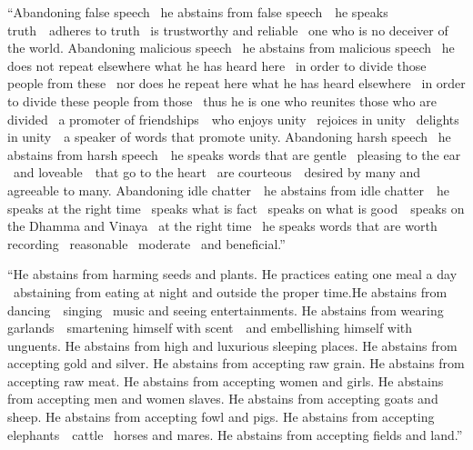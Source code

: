 \begin{english-only-justify}
  ``Abandoning false speech \breathmark\ he abstains from false \mbox{speech}~\breathmark\ he speaks \mbox{truth}~\breathmark\ adheres to truth \breathmark\ is trustworthy and reliable \breathmark\ one who is no deceiver of the world. Abandoning malicious speech \breathmark\ he abstains from malicious speech \breathmark\ he does not repeat elsewhere what he has heard here \breathmark\ in order to divide those people\makeatletter\hyperlink{endnote59-appendix}\makeatother
  from these \breathmark\ nor does he repeat here what he has heard elsewhere \breathmark\ in order to divide these people from those \breathmark\ thus he is one who reunites those who are divided \breathmark\ a promoter of \mbox{friendships}~\breathmark\ who enjoys unity \breathmark\ rejoices in unity \breathmark\ delights in \mbox{unity}~\breathmark\ a speaker of words that promote unity. Abandoning harsh speech \breathmark\ he abstains from harsh \mbox{speech}~\breathmark\ he speaks words that are gentle \breathmark\ pleasing to the ear \breathmark\ and \mbox{loveable}~\breathmark\ that go to the heart \breathmark\ are \mbox{courteous}~\breathmark\ desired by many and agreeable to many. Abandoning idle \mbox{chatter}~\breathmark\ he abstains from idle \mbox{chatter}~\breathmark\ he speaks at the right time \breathmark\ speaks what is fact \breathmark\ speaks on what is \mbox{good}~\breathmark\ speaks on the Dhamma and Vinaya \breathmark\ at the right time \breathmark\ he speaks words that are worth recording \breathmark\ reasonable \breathmark\ moderate \breathmark\ and beneficial.''
\end{english-only-justify}

\begin{english-only-justify}
  ``He abstains from harming seeds and plants. He practices eating one meal a day \breathmark\ abstaining from eating at night and outside the proper time.\makeatletter\hyperlink{endnote148-appendix}\makeatother\thinspace He abstains from \mbox{dancing}~\breathmark\ singing \breathmark\ music and seeing entertainments. He abstains from wearing \mbox{garlands}~\breathmark\ smartening himself with \mbox{scent}~\breathmark\ and embellishing himself with unguents. He abstains from high and luxurious sleeping places. He abstains from accepting gold and silver. He abstains from accepting raw grain. He abstains from accepting raw meat. He abstains from accepting women and girls. He abstains from accepting men and women slaves. He abstains from accepting goats and sheep. He abstains from accepting fowl and pigs. He abstains from accepting \mbox{elephants}~\breathmark\ cattle \breathmark\ horses and mares. He abstains from accepting fields and land.''
\end{english-only-justify}

